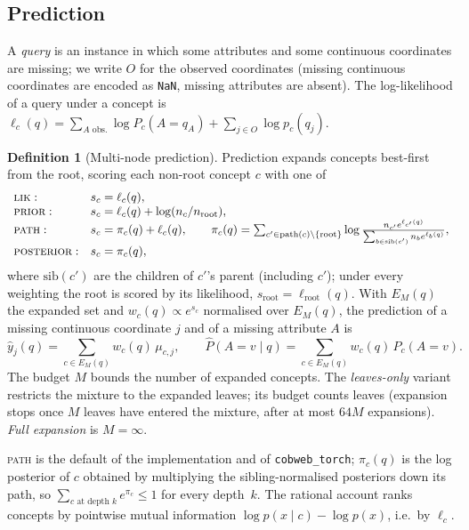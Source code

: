 \documentclass[11pt]{article}
\theoremstyle{definition}
\newtheorem{definition}[theorem]{Definition}
\theoremstyle{remark}
\newcommand{\hy}{\hat{y}}
\begin{document}
\subsection{Prediction}

A \emph{query} is an instance in which some attributes and some continuous
coordinates are missing; we write $O$ for the observed coordinates (missing continuous
coordinates are encoded as \texttt{NaN}, missing attributes are absent).  The
log-likelihood of a query under a concept is
$\ell_c(q)=\sum_{A\text{ obs.}}\log P_c(A{=}q_A)+\sum_{j\in O}\log p_c(q_j)$.

\begin{definition}[Multi-node prediction]\label{def:predict}
Prediction expands concepts best-first from the root, scoring each non-root concept $c$
with one of
\[
\begin{array}{ll}
\textsc{lik}: & s_c=\ell_c(q),\\
\textsc{prior}: & s_c=\ell_c(q)+\log(n_c/n_{\text{root}}),\\
\textsc{path}: & s_c=\pi_c(q)+\ell_c(q),\qquad
  \pi_c(q)=\sum_{c'\in\text{path}(c)\setminus\{\text{root}\}}
  \log\frac{n_{c'}e^{\ell_{c'}(q)}}{\sum_{b\in\text{sib}(c')}n_b e^{\ell_b(q)}},\\
\textsc{posterior}: & s_c=\pi_c(q),
\end{array}
\]
where $\text{sib}(c')$ are the children of $c'$'s parent (including $c'$); under every
weighting the root is scored by its likelihood, $s_{\text{root}}=\ell_{\text{root}}(q)$.
With $E_M(q)$ the expanded set and $w_c(q)\propto e^{s_c}$ normalised over $E_M(q)$, the
prediction of a missing continuous coordinate $j$ and of a missing attribute $A$ is
\[
  \hy_j(q)=\sum_{c\in E_M(q)}w_c(q)\,\mu_{c,j},\qquad
  \hat P(A{=}v\mid q)=\sum_{c\in E_M(q)}w_c(q)\,P_c(A{=}v).
\]
The budget $M$ bounds the number of expanded concepts.  The \emph{leaves-only} variant
restricts the mixture to the expanded leaves; its budget counts leaves (expansion stops
once $M$ leaves have entered the mixture, after at most $64M$ expansions).  \emph{Full
expansion} is $M=\infty$.
\end{definition}

\textsc{path} is the default of the implementation and of \texttt{cobweb\_torch};
$\pi_c(q)$ is the log posterior of $c$ obtained by multiplying the sibling-normalised
posteriors down its path, so $\sum_{c\text{ at depth }k}e^{\pi_c}\le1$ for every
depth~$k$.  The rational account \citep{maclellan2026rational} ranks concepts by
pointwise mutual information $\log p(x\mid c)-\log p(x)$, i.e.\ by $\ell_c$.
\end{document}
